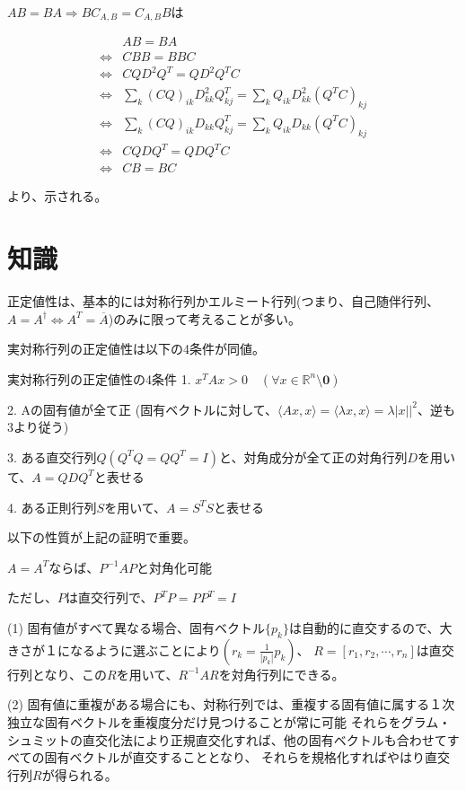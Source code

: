 \documentclass[a4paper, 10pt, dvipdfmx]{jlreq}
\begin{document}
$AB=BA \Rightarrow BC_{A,B}=C_{A,B}B$は

\begin{align*}
                    & AB=BA                                                             \\
    \Leftrightarrow & CBB=BBC                                                           \\
    \Leftrightarrow & CQD^2Q^T=QD^2Q^TC                                                 \\
    \Leftrightarrow & \sum_k (CQ)_{ik}D^2_{kk}Q^T_{kj}=\sum_k Q_{ik}D^2_{kk}(Q^TC)_{kj} \\
    \Leftrightarrow & \sum_k (CQ)_{ik}D_{kk}Q^T_{kj}=\sum_k Q_{ik}D_{kk}(Q^TC)_{kj}     \\
    \Leftrightarrow & CQDQ^T=QDQ^TC                                                     \\
    \Leftrightarrow & CB=BC
\end{align*}

より、示される。

\section{知識}

正定値性は、基本的には対称行列かエルミート行列(つまり、自己随伴行列、$A=A^{\dagger} \Leftrightarrow A^T=\overline{A}$)のみに限って考えることが多い。

実対称行列の正定値性は以下の4条件が同値。

\begin{itembox}[l]{実対称行列の正定値性の4条件}
    1. $x^TAx>0 \quad (\forall x\in \mathbb{R}^n\setminus {\boldsymbol{0}})$

    2. Aの固有値が全て正 (固有ベクトルに対して、$\langle Ax,x \rangle = \langle \lambda x,x \rangle =\lambda |x||^2$、逆も3より従う)

    3. ある直交行列$Q(Q^TQ=QQ^T=I)$と、対角成分が全て正の対角行列$D$を用いて、$A=QDQ^T$と表せる

    4. ある正則行列$S$を用いて、$A=S^TS$と表せる
\end{itembox}


以下の性質が上記の証明で重要。

\begin{itembox}[l]{$A=A^T$ならば、$P^{-1}AP$と対角化可能}

    ただし、$P$は直交行列で、$P^TP=PP^T=I$

    (1) 固有値がすべて異なる場合、固有ベクトル$\{p_k\}$は自動的に直交するので、大きさが１になるように選ぶことにより$(r_k=\frac{1}{|p_k|}p_k)$、
    $R=[r_1, r_2, \cdots, r_n]$は直交行列となり、この$R$を用いて、$R^{-1}AR$を対角行列にできる。

    (2) 固有値に重複がある場合にも、対称行列では、重複する固有値に属する１次独立な固有ベクトルを重複度分だけ見つけることが常に可能
    それらをグラム・シュミットの直交化法により正規直交化すれば、他の固有ベクトルも合わせてすべての固有ベクトルが直交することとなり、 それらを規格化すればやはり直交行列$R$が得られる。
\end{itembox}
\end{document}
